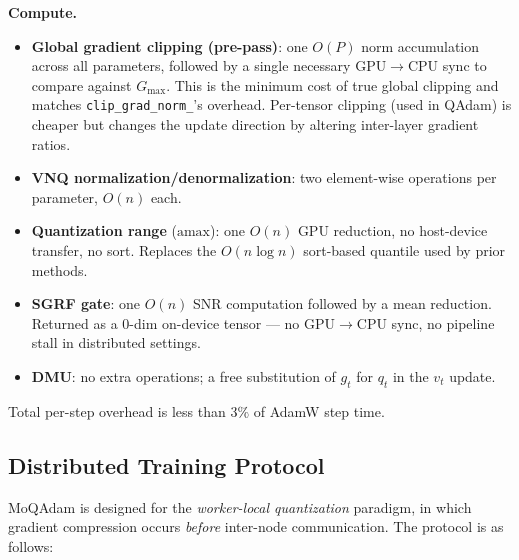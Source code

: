 \documentclass[10pt,twocolumn]{article}
\begin{document}
\textbf{Compute.}
\begin{itemize}
  \item \textbf{Global gradient clipping (pre-pass)}: one $O(P)$ norm
    accumulation across all parameters, followed by a single necessary
    GPU$\to$CPU sync to compare against $G_{\max}$.  This is the minimum
    cost of true global clipping and matches \texttt{clip\_grad\_norm\_}'s
    overhead.  Per-tensor clipping (used in QAdam) is cheaper but changes
    the update direction by altering inter-layer gradient ratios.
  \item \textbf{VNQ normalization/denormalization}: two element-wise
    operations per parameter, $O(n)$ each.
  \item \textbf{Quantization range} ($\mathrm{amax}$): one $O(n)$ GPU
    reduction, no host-device transfer, no sort.  Replaces the
    $O(n \log n)$ sort-based quantile used by prior methods.
  \item \textbf{SGRF gate}: one $O(n)$ SNR computation followed by a
    mean reduction.  Returned as a $0$-dim on-device tensor — no
    GPU$\to$CPU sync, no pipeline stall in distributed settings.
  \item \textbf{DMU}: no extra operations; a free substitution of
    $g_t$ for $q_t$ in the $v_t$ update.
\end{itemize}
Total per-step overhead is less than $3\%$ of AdamW step time.

\subsection{Distributed Training Protocol}
\label{sec:distributed}

MoQAdam is designed for the \emph{worker-local quantization} paradigm,
in which gradient compression occurs \emph{before} inter-node communication.
The protocol is as follows:
\end{document}
